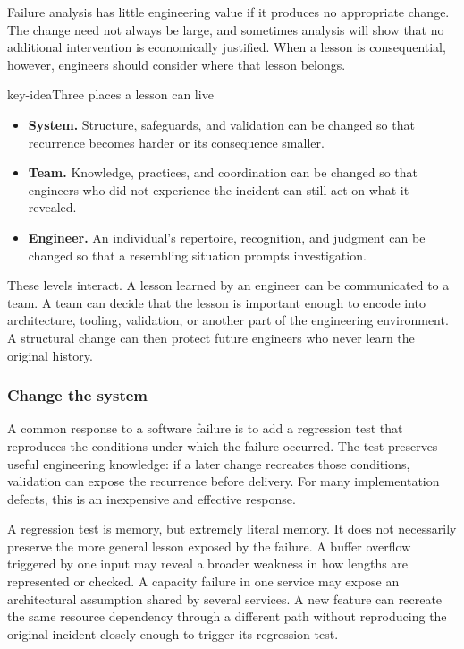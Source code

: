 Failure analysis has little engineering value if it produces no appropriate change. The change need
not always be large, and sometimes analysis will show that no additional intervention is
economically justified. When a lesson is consequential, however, engineers should consider where
that lesson belongs.

\begin{bookbox}{key-idea}{Three places a lesson can live} %
\begin{itemize}
\tightlist
\item
  \textbf{System.} Structure, safeguards, and validation can be changed so that recurrence becomes
  harder or its consequence smaller.
\item
  \textbf{Team.} Knowledge, practices, and coordination can be changed so that engineers who did not
  experience the incident can still act on what it revealed.
\item
  \textbf{Engineer.} An individual's repertoire, recognition, and judgment can be changed so that a
  resembling situation prompts investigation.
\end{itemize}

These levels interact. A lesson learned by an engineer can be communicated to a team. A team can
decide that the lesson is important enough to encode into architecture, tooling, validation, or
another part of the engineering environment. A structural change can then protect future engineers
who never learn the original history.
\end{bookbox}

\subsubsection{Change the system}\label{sec-change-the-system}

A common response to a software failure is to add a regression test that reproduces the conditions
under which the failure occurred. The test preserves useful engineering knowledge: if a later
change recreates those conditions, validation can expose the recurrence before delivery. For many
implementation defects, this is an inexpensive and effective response.

A regression test is memory, but extremely literal memory. It does not necessarily preserve the
more general lesson exposed by the failure. A buffer overflow triggered by one input may reveal a broader weakness in how lengths are represented
or checked. A capacity failure in one service may expose an architectural assumption shared by
several services. A new feature can recreate the same resource dependency through a different path
without reproducing the original incident closely enough to trigger its regression test.

